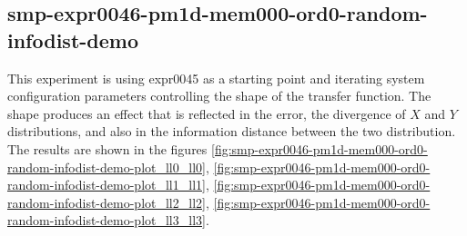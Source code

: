 \subsection*{smp-expr0046-pm1d-mem000-ord0-random-infodist-demo}
\label{sec:smp-expr0046-pm1d-mem000-ord0-random-infodist-demo}

This experiment is using expr0045 as a starting point and
iterating system configuration parameters controlling the shape of the
transfer function. The shape produces an effect that is reflected in
the error, the divergence of $X$ and $Y$ distributions, and also in the
information distance between the two distribution.
The results are shown in the figures
\ref{fig:smp-expr0046-pm1d-mem000-ord0-random-infodist-demo-plot_ll0_ll0},
\ref{fig:smp-expr0046-pm1d-mem000-ord0-random-infodist-demo-plot_ll1_ll1},
\ref{fig:smp-expr0046-pm1d-mem000-ord0-random-infodist-demo-plot_ll2_ll2},
\ref{fig:smp-expr0046-pm1d-mem000-ord0-random-infodist-demo-plot_ll3_ll3}.

\newpage
{}

\newpage

